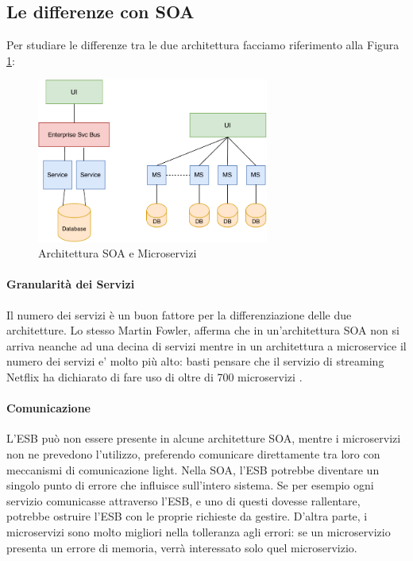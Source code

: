 \subsection{Le differenze con SOA}
Per studiare le differenze tra le due architettura facciamo riferimento alla Figura \ref{fig:soavsmicroservices}:
\begin{figure}[H]
    \centering
    \includegraphics[width=0.68\textwidth]{images/01_8_microservices_vs_soa.pdf}
    \caption{Architettura SOA e Microservizi }
    \label{fig:soavsmicroservices}
\end{figure}
\paragraph*{Granularità dei Servizi} Il numero dei servizi è un buon fattore per la differenziazione delle due architetture. Lo stesso Martin Fowler, afferma che in un'architettura SOA non si arriva neanche ad una decina di  servizi mentre in un architettura a microservice il numero dei servizi e’ molto più alto: basti pensare che il servizio di streaming Netflix ha dichiarato di fare uso di oltre di 700 microservizi \cite{article:netflixmicroservices}.

\paragraph{Comunicazione} L'ESB può non essere presente in alcune architetture SOA, mentre i microservizi non ne prevedono l’utilizzo, preferendo comunicare direttamente tra loro con meccanismi di comunicazione light. Nella SOA, l’ESB potrebbe diventare un singolo punto di errore che influisce sull’intero sistema. Se per esempio ogni servizio comunicasse attraverso l’ESB, e uno di questi dovesse rallentare, potrebbe ostruire l’ESB con le proprie richieste da gestire. D’altra parte, i microservizi sono molto migliori nella tolleranza agli errori: se un microservizio presenta un errore di memoria, verrà interessato solo quel microservizio.

